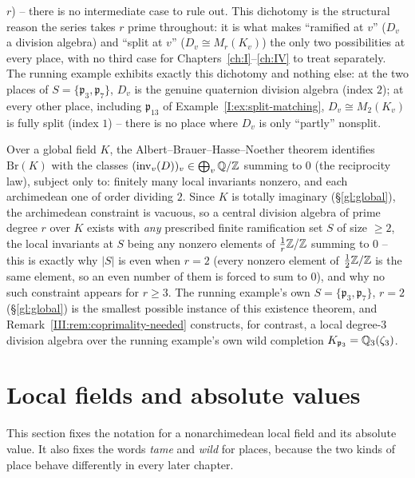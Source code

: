 \begin{description}
$r$) -- there is no intermediate case to rule out. This dichotomy is
the structural reason the series takes $r$ prime throughout: it is
what makes ``ramified at $v$'' ($D_v$ a division algebra) and
``split at $v$'' ($D_v\cong M_r(K_v)$) the only two possibilities at
every place, with no third case for Chapters~\ref{ch:I}--\ref{ch:IV}
to treat separately. The running example exhibits exactly this
dichotomy and nothing else: at the two places of $S=\{\mathfrak
p_3,\mathfrak p_7\}$, $D_v$ is the genuine quaternion division
algebra (index $2$); at every other place, including $\mathfrak p_{13}$
of Example~\ref{I:ex:split-matching}, $D_v\cong M_2(K_v)$ is fully
split (index $1$) -- there is no place where $D_v$ is only ``partly''
nonsplit.
\item[Global existence and the reciprocity obstruction] Over a
global field $K$, the Albert--Brauer--Hasse--Noether theorem
identifies $\mathrm{Br}(K)$ with the classes
$(\mathrm{inv}_v(D))_v\in\bigoplus_v\mathbb{Q}/\mathbb Z$ summing to $0$ (the
reciprocity law), subject only to: finitely many local invariants
nonzero, and each archimedean one of order dividing $2$. Since $K$ is
totally imaginary (\S\ref{gl:global}), the archimedean constraint is
vacuous, so a central division algebra of prime degree $r$ over $K$
exists with \emph{any} prescribed finite ramification set $S$ of
size $\ge2$, the local invariants at $S$ being any nonzero elements
of $\tfrac1r\mathbb Z/\mathbb Z$ summing to $0$ -- this is exactly why $|S|$ is
even when $r=2$ (every nonzero element of $\tfrac12\mathbb Z/\mathbb Z$ is the same
element, so an even number of them is forced to sum to $0$), and why
no such constraint appears for $r\ge3$. The running example's own
$S=\{\mathfrak p_3,\mathfrak p_7\}$, $r=2$ (\S\ref{gl:global}) is the
smallest possible instance of this existence theorem, and
Remark~\ref{III:rem:coprimality-needed} constructs, for contrast, a
local degree-$3$ division algebra over the running example's own
wild completion $K_{\mathfrak p_3}=\mathbb{Q}_3(\zeta_3)$.
\end{description}

\section{Local fields and absolute values}\label{gl:local}
This section fixes the notation for a nonarchimedean local field and its absolute value. It also fixes the words \emph{tame} and \emph{wild} for places, because the two kinds of place behave differently in every later chapter.

